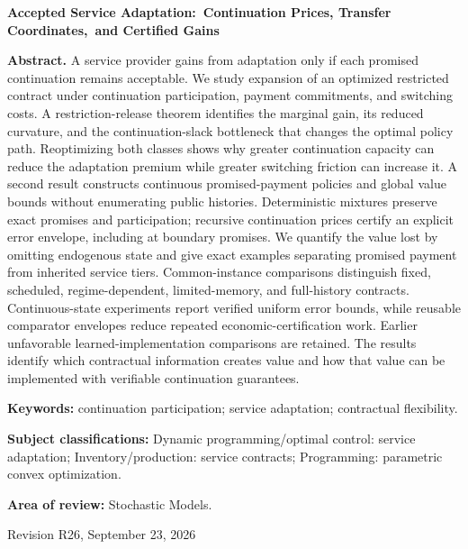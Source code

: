 \documentclass[11pt,letterpaper]{article}
\theoremstyle{definition}\newtheorem{assumption}[theorem]{Assumption}
\begin{document}
\begin{titlepage}\centering
{\Large\bfseries Accepted Service Adaptation:\ Continuation Prices, Transfer Coordinates,\ and Certified Gains\par}
\vspace{.35in}{Anonymous manuscript for Operations Research\par}\vspace{.25in}
\begin{minipage}{\textwidth}
\textbf{Abstract.}
A service provider gains from adaptation only if each promised continuation remains acceptable. We study expansion of an optimized restricted contract under continuation participation, payment commitments, and switching costs. A restriction-release theorem identifies the marginal gain, its reduced curvature, and the continuation-slack bottleneck that changes the optimal policy path. Reoptimizing both classes shows why greater continuation capacity can reduce the adaptation premium while greater switching friction can increase it. A second result constructs continuous promised-payment policies and global value bounds without enumerating public histories. Deterministic mixtures preserve exact promises and participation; recursive continuation prices certify an explicit error envelope, including at boundary promises. We quantify the value lost by omitting endogenous state and give exact examples separating promised payment from inherited service tiers. Common-instance comparisons distinguish fixed, scheduled, regime-dependent, limited-memory, and full-history contracts. Continuous-state experiments report verified uniform error bounds, while reusable comparator envelopes reduce repeated economic-certification work. Earlier unfavorable learned-implementation comparisons are retained. The results identify which contractual information creates value and how that value can be implemented with verifiable continuation guarantees.
\par\vspace{.15in}\textbf{Keywords:} continuation participation; service adaptation; contractual flexibility.
\par\vspace{.1in}\textbf{Subject classifications:} Dynamic programming/optimal control: service adaptation; Inventory/production: service contracts; Programming: parametric convex optimization.
\par\vspace{.1in}\textbf{Area of review:} Stochastic Models.
\end{minipage}\vfill{Revision R26, September 23, 2026\par}
\end{titlepage}
\end{document}
